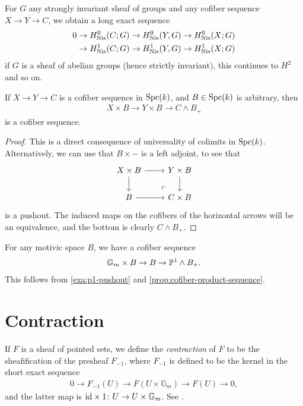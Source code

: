 \documentclass[11pt,openany]{book}
\let\smashprod\wedge
\begin{document}
\begin{proposition} For $G$ any strongly invariant sheaf of groups and any cofiber sequence $X \to Y \to C$, we obtain a long exact sequence
\begin{align*}
    0 \to H_{\mathrm{Nis}}^0(C;G) \to H^0_{\mathrm{Nis}}(Y,G) \to H^0_{\mathrm{Nis}}(X;G) \\
    \to  H_{\mathrm{Nis}}^1(C;G) \to H^1_{\mathrm{Nis}}(Y,G) \to H^1_{\mathrm{Nis}}(X;G)
\end{align*}
if $G$ is a sheaf of abelian groups (hence strictly invariant), this continues to $H^2$ and so on.
\end{proposition}

\begin{proposition}\label{prop:cofiber-product-sequence} 
If $X \to Y \to C$ is a cofiber sequence in $\mathrm{Spc}(k)$, and $B \in \mathrm{Spc}(k)$ is arbitrary, then
\begin{align*}
    X \times B \to Y \times B \to C \smashprod B_+
\end{align*}
is a cofiber sequence.
\end{proposition}
\begin{proof} This is a direct consequence of universality of colimits in $\mathrm{Spc}(k)$. Alternatively, we can use that $B \times -$ is a left adjoint, to see that
\[ \begin{tikzcd}
    X \times B\rar\dar & Y \times B\dar\\
    B\rar & C \times B\po
\end{tikzcd} \]
is a pushout. The induced maps on the cofibers of the horizontal arrows will be an equivalence, and the bottom is clearly $C \smashprod B_+$.
\end{proof}

%
\begin{example} For any motivic space $B$, we have a cofiber sequence
\begin{align*}
    \mathbb{G}_m \times B \to B \to \P^1 \smashprod B_+.
\end{align*}
This follows from \autoref{exa:p1-pushout} and \autoref{prop:cofiber-product-sequence}.
\end{example}


\section{Contraction}

\begin{definition} If $F$ is a sheaf of pointed sets, we define the \textit{contraction} of $F$ to be the sheafification of the presheaf $F_{-1}$, where $F_{-1}$ is defined to be the kernel in the short exact sequence
\begin{align*}
    0 \to F_{-1}(U) \to F(U \times \mathbb{G}_m) \to F(U) \to 0,
\end{align*}
and the latter map is $\mathrm{id} \times 1 \colon U \to U \times \mathbb{G}_m$. See \cite[2.1.10]{Freudenthal}.
\end{definition}
\end{document}
